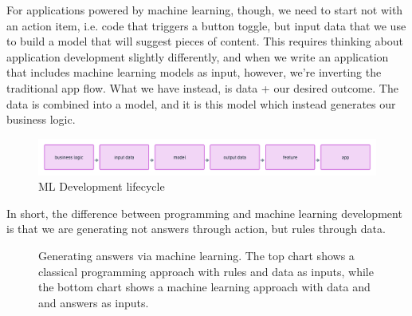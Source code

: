 \documentclass[draft, 11pt]{diazessay} %
\begin{document}
For applications powered by machine learning, though, we need to start not with an action item, i.e. code that triggers a button toggle, but input data that we use to build a model that will suggest pieces of content. This requires thinking about application development slightly differently, and when we write an application that includes machine learning models as input, however, we’re inverting the traditional app flow. What we have instead, is data + our desired outcome. The data is combined into a model, and it is this model which instead generates our business logic. 

\begin{figure}[!ht]
\centering
\includegraphics[width=.75\textwidth]{figures/ml_flow.png}
\caption{ML Development lifecycle}
\end{figure}

In short, the difference between programming and machine learning development is that we are generating not answers through action, but rules through data.

\begin{figure}[H]
\centering
{}
\caption{Generating answers via machine learning. The top chart shows a classical programming approach with rules and data as inputs, while the bottom chart shows a machine learning approach with data and and answers as inputs. \citep{chollet2021deep}}
\end{figure}
\end{document}
